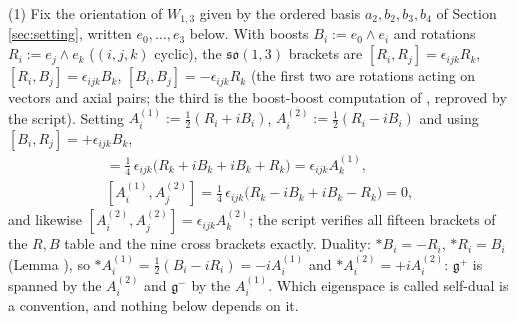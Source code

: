(1) Fix the orientation of $W_{1,3}$ given by the ordered basis $a_2, b_2, b_3, b_4$ of Section \ref{sec:setting}, written $e_0, \dots, e_3$ below. With boosts $B_i := e_0\wedge e_i$ and rotations $R_i := e_j\wedge e_k$ ($(i,j,k)$ cyclic), the $\mathfrak{so}(1,3)$ brackets are $[R_i, R_j] = \epsilon_{ijk}R_k$, $[R_i, B_j] = \epsilon_{ijk}B_k$, $[B_i, B_j] = -\epsilon_{ijk}R_k$ (the first two are rotations acting on vectors and axial pairs; the third is the boost-boost computation of \cite[Lem.~5.4]{ButlerT6}, reproved by the script). Setting $A^{(1)}_i := \tfrac12(R_i + iB_i)$, $A^{(2)}_i := \tfrac12(R_i - iB_i)$ and using $[B_i, R_j] = +\epsilon_{ijk}B_k$,
\begin{gather*}
[A^{(1)}_i, A^{(1)}_j] = \tfrac14\,\epsilon_{ijk}\bigl(R_k + iB_k + iB_k + R_k\bigr) = \epsilon_{ijk}A^{(1)}_k,\\
[A^{(1)}_i, A^{(2)}_j] = \tfrac14\,\epsilon_{ijk}\bigl(R_k - iB_k + iB_k - R_k\bigr) = 0,
\end{gather*}
and likewise $[A^{(2)}_i, A^{(2)}_j] = \epsilon_{ijk}A^{(2)}_k$; the script verifies all fifteen brackets of the $R, B$ table and the nine cross brackets exactly. Duality: $\ast B_i = -R_i$, $\ast R_i = B_i$ (Lemma ), so $\ast A^{(1)}_i = \tfrac12(B_i - iR_i) = -iA^{(1)}_i$ and $\ast A^{(2)}_i = +iA^{(2)}_i$: $\mathfrak{g}^+$ is spanned by the $A^{(2)}_i$ and $\mathfrak{g}^-$ by the $A^{(1)}_i$. Which eigenspace is called self-dual is a convention, and nothing below depends on it.
